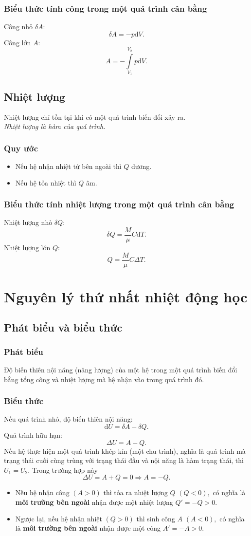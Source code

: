 \subsubsection{Biểu thức tính công trong một quá trình cân bằng}
Công nhỏ $\delta A:$
$$\delta A = -p \mathrm{d}V.$$
Công lớn $A:$ 
$$A =  - \int\limits_{{V_1}}^{{V_2}} {p \mathrm{d} V} .$$
\subsection{Nhiệt lượng}
Nhiệt lượng chỉ tồn tại khi có một quá trình biến đổi xảy ra.\\
\textit{Nhiệt lượng là hàm của quá trình.}
\subsubsection{Quy ước}
\begin{itemize}
\item Nếu hệ nhận nhiệt từ bên ngoài thì $Q$ dương.
\item Nếu hệ tỏa nhiệt thì $Q$ âm.
\end{itemize}
\subsubsection{Biểu thức tính nhiệt lượng trong một quá trình cân bằng}
Nhiệt lượng nhỏ $\delta Q:$
$$\delta Q = \frac{M}{\mu} C \mathrm{d}T.$$
Nhiệt lượng lớn $Q:$
$$Q = \frac{M}{\mu} C \Delta T.$$
\section{Nguyên lý thứ nhất nhiệt động học}
\subsection{Phát biểu và biểu thức}
\subsubsection{Phát biểu}
Độ biến thiên nội năng (năng lượng) của một hệ trong một quá trình biến đổi bằng tổng công và nhiệt lượng mà hệ nhận vào trong quá trình đó.
\subsubsection{Biểu thức}
Nếu quá trình nhỏ, độ biến thiên nội năng:
$$\mathrm{d}U = \delta A + \delta Q.$$
Quá trình hữu hạn:
$$\Delta U = A + Q.$$
Nếu hệ thực hiện một quá trình khép kín (một chu trình), nghĩa là quá trình mà trạng thái cuối cùng trùng với trạng thái đầu và nội năng là hàm trạng thái, thì $U_1 = U_2.$ Trong trường hợp này
$$\Delta U = A + Q = 0 \Rightarrow A = - Q.$$
\begin{itemize}
\item Nếu hệ nhận công $\left( {A > 0} \right)$ thì tỏa ra nhiệt lượng $Q$ $\left( {Q < 0} \right),$ có nghĩa là \textbf{môi trường bên ngoài} nhận được một nhiệt lượng $Q' = - Q > 0.$
\item Ngược lại, nếu hệ nhận nhiệt $\left( {Q > 0} \right)$ thì sinh công $A$ $\left( {A < 0} \right),$ có nghĩa là \textbf{môi trường bên ngoài} nhận được một công $A' = - A > 0.$
\end{itemize}
